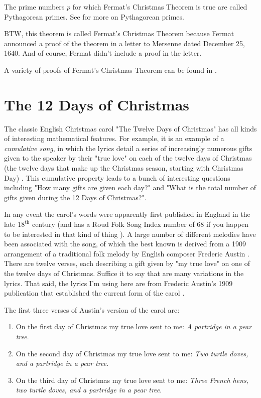 \documentclass{article}
\theoremstyle{definition}
\begin{document}
\bigskip
\noindent
The prime numbers $p$ for which Fermat's Christmas Theorem is
true are called Pythagorean primes.  See
\cite{wiki:pythagorean_primes} for more on Pythagorean primes.

\bigskip
\noindent
BTW, this theorem is called Fermat's Christmas Theorem because
Fermat announced a proof of the theorem in a letter to Mersenne
dated December 25, 1640. And of course, Fermat didn't include a
proof in the letter.


\bigskip
\noindent
A variety of proofs of Fermat's Christmas Theorem can be found in
\cite{wiki:christmas_theorem_proofs}.
%
%
%
\section{The 12 Days of Christmas}
\label{sec:12_days_of_christmas}
The classic English Christmas carol "The Twelve Days of
Christmas" has all kinds of interesting mathematical
features. For example, it is an example of a \emph{cumulative
song}, in which the lyrics detail a series of increasingly
numerous gifts given to the speaker by their "true love" on each
of the twelve days of Christmas (the twelve days that make up the
Christmas season, starting with Christmas Day)
\cite{wikipedia:cumulative_song}. This cumulative property leads
to a bunch of interesting questions including "How many gifts are
given each day?" and "What is the total number of gifts given
during the 12 Days of Christmas?".

\bigskip
\noindent
In any event the carol's words were apparently first published in
England in the late $18^{\text{th}}$ century (and has a Roud Folk
Song Index number of 68 if you happen to be interested in that
kind of thing \cite{wikipedia:roud_folk_song_index}). A large
number of different melodies have been associated with the song,
of which the best known is derived from a 1909 arrangement of a
traditional folk melody by English composer Frederic Austin
\cite{wikipedia:twelve_days_of_christmas}.  There are twelve
verses, each describing a gift given by "my true love" on one of
the twelve days of Christmas. Suffice it to say that are many
variations in the lyrics. That said, the lyrics I'm using here
are from Frederic Austin's 1909 publication that established the
current form of the carol \cite{wikipedia:frederic_austin}.

\bigskip
\noindent
The first three verses of Austin's version of the carol are:

\smallskip
\begin{enumerate}
\item On the first day of Christmas my true love sent to me:
\emph{A partridge in a pear tree}.

\item On the second day of Christmas my true love sent to me:
\emph{Two turtle doves, and a partridge in a pear tree}.

\item On the third day of Christmas my true love sent to me:
\emph{Three French hens, two turtle doves, and a partridge in 
a pear tree}.
\end{enumerate}
\end{document}
